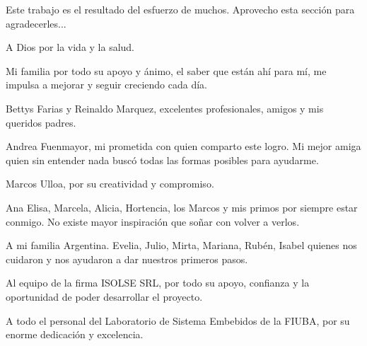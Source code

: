 \documentclass[
11pt, %
spanish,
singlespacing, %
parskip, %
headsepline, %
]{MastersDoctoralThesis} %
\begin{document}
\begin{acknowledgements}
\vspace{1.5cm}

Este trabajo es el resultado del esfuerzo de muchos. Aprovecho esta sección para agradecerles...

A Dios por la vida y la salud.

Mi familia por todo su apoyo y ánimo, el saber que están ahí para mí, me impulsa a mejorar y seguir creciendo cada día.   

Bettys Farias y Reinaldo Marquez, excelentes profesionales, amigos y mis queridos padres.

Andrea Fuenmayor, mi prometida con quien comparto este logro. Mi mejor amiga quien sin entender nada buscó todas las formas posibles para ayudarme.    

Marcos Ulloa, por su creatividad y compromiso. 

Ana Elisa, Marcela, Alicia, Hortencia, los Marcos y mis primos por siempre estar conmigo. No existe mayor inspiración que soñar con volver a verlos. 

A mi familia Argentina. Evelia, Julio, Mirta, Mariana, Rubén, Isabel quienes nos cuidaron y nos ayudaron a dar nuestros primeros pasos.  

Al equipo de la firma ISOLSE SRL, por todo su apoyo, confianza y la oportunidad de poder desarrollar el proyecto.

A todo el personal del Laboratorio de Sistema Embebidos de la FIUBA, por su enorme dedicación y excelencia. 

\end{acknowledgements}

\renewcommand{\listtablename}{Índice de Tablas} %

\tableofcontents %
%
\listoffigures %
%
\listoftables %


\end{document}
